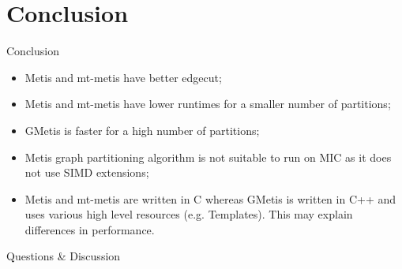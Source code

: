 \documentclass{beamer}
\begin{document}



\section{Conclusion}

\begin{frame}{Conclusion}
\begin{itemize}
  \item Metis and mt-metis have better edgecut;
  \item Metis and mt-metis have lower runtimes for a smaller number of partitions;
  \item GMetis is faster for a high number of partitions;
  \item Metis graph partitioning algorithm is not suitable to run on MIC as it does not use SIMD extensions;
  \item Metis and mt-metis are written in C whereas GMetis is written in C++ and uses various high level resources (e.g. Templates). This may explain differences in performance.
\end{itemize}
\end{frame}



\begin{frame}
  \titlepage
  \begin{center}
  \huge Questions \& Discussion
  \end{center}
\end{frame}
\end{document}
